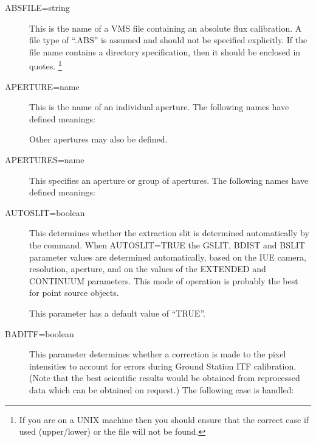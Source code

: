 \begin {description}

\item [ABSFILE=string]
This is the name of a VMS file containing an absolute flux calibration.
A file type of ``.ABS'' is assumed and should not be specified
explicitly.
If the file name contains a directory specification, then it should be
enclosed in quotes.
\footnote{If you are on a UNIX machine then you should ensure that the
correct case if used (upper/lower) or the file will not be found.}

\item [APERTURE=name]
This is the name of an individual aperture.
The following names have defined meanings:

\begin {quote}
\end {quote}

Other apertures may also be defined.

\item [APERTURES=name]
This specifies an aperture or group of apertures.
The following names have defined meanings:

\begin {quote}
\end {quote}

\item [AUTOSLIT=boolean]
This determines whether the extraction slit is determined automatically
by the command.
When AUTOSLIT=TRUE the GSLIT, BDIST and BSLIT parameter values are
determined automatically, based on the IUE camera, resolution, aperture,
and on the values of the EXTENDED and CONTINUUM parameters.
This mode of operation is probably the best for point source objects.

This parameter has a default value of ``TRUE''.

\item [BADITF=boolean]
This parameter determines whether a correction is made to the pixel
intensities to account for errors during Ground Station ITF
calibration.
(Note that the best scientific results would be obtained 
from reprocessed data which can be obtained on request.)
The following case is handled:


\end{description}
